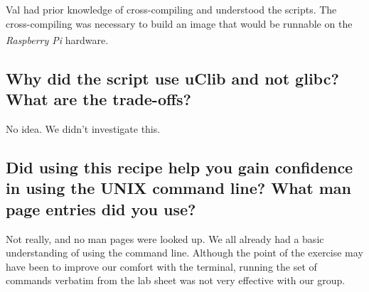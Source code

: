\documentclass[11pt,a4paper,titlepage]{report}
\newcommand{\rpi}{\textit{Raspberry Pi\textsuperscript{\textregistered}}}
\begin{document}
\begin{appendices}
Val had prior knowledge of cross-compiling and understood the scripts. The cross-compiling was necessary to build an image that would be runnable on the \rpi\xspace hardware.

\subsection*{Why did the script use uClib and not glibc? What are the trade-offs?}

No idea. We didn't investigate this.

\subsection*{Did using this recipe help you gain confidence in using the UNIX command 
line? What man page entries did you use? }

Not really, and no man pages were looked up. We all already had a basic understanding of using the command line. Although the point of the exercise may have been to improve our comfort with the terminal, running the set of commands verbatim from the lab sheet was not very effective with our group.

\end{appendices}




\nocite{*}
\printbibliography[heading=bibintoc]
\end{document}
